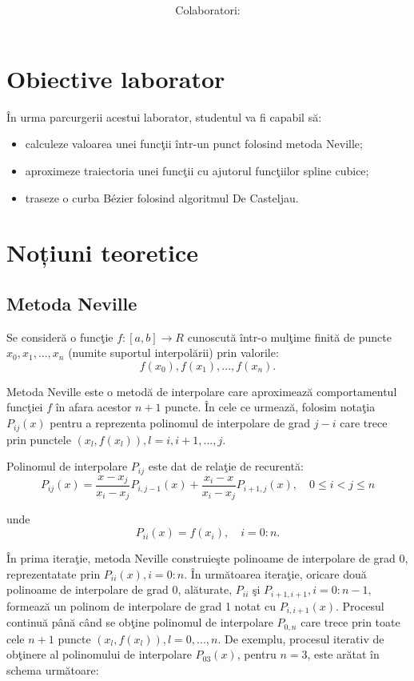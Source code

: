 \documentclass{exam}
\title{
	\textmd{\textbf{\MNLabTitle}}
	\author{Colaboratori: \MNAuthor}
}
\begin{document}
\begin{coverpages}

	\maketitle
	\tableofcontents

\end{coverpages}

\section{Obiective laborator}

În urma parcurgerii acestui laborator, studentul va fi capabil să:
\begin{itemize}
	\item calculeze valoarea unei funcţii într-un punct folosind metoda Neville;
	\item aproximeze traiectoria unei funcţii cu ajutorul funcţiilor spline cubice;
	\item traseze o curba B\'{e}zier folosind algoritmul De Casteljau.
\end{itemize}

\section{Noțiuni teoretice}

\subsection{Metoda Neville}

Se consideră o funcţie $f:[a, b] \rightarrow R$ cunoscută într-o mulţime finită de puncte $x_0,x_1, ...,x_n$ (numite suportul interpolării) prin valorile: $$f(x_0), f(x_1), ...,f(x_n).$$

Metoda Neville este o metodă de interpolare care aproximează comportamentul funcţiei $f$ în afara acestor $n+1$ puncte. În cele ce urmează, folosim notaţia $P_{ij}(x)$ pentru a reprezenta polinomul de interpolare de grad $j-i$ care trece prin punctele $(x_l, f(x_{l})), l=i, i+1,...,j$.

Polinomul de interpolare $P_{ij}$ este dat de relaţie de recurentă:
$$P_{ij}(x) = \frac{x-x_j}{x_i-x_j}P_{i,j-1}(x) + \frac{x_i-x}{x_i-x_j}P_{i+1,j}(x), \quad 0 \leq i < j \leq n $$

\noindent unde
$$P_{ii}(x)=f(x_{i}), \quad i = 0:n.$$

În prima iteraţie, metoda Neville construieşte polinoame de interpolare de grad 0, reprezentatate prin $P_{ii}(x), i = 0:n$. În următoarea iteraţie, oricare două polinoame de interpolare de grad 0, alăturate, $P_{ii}$ şi $P_{i+1, i+1}, i=0:n-1$, formează un polinom de interpolare de grad 1 notat cu $P_{i, i+1}(x)$. Procesul continuă până când se obţine polinomul de interpolare $P_{0, n}$ care trece prin toate cele $n+1$ puncte $(x_l, f(x_{l})), l=0,...,n$. De exemplu, procesul iterativ de obţinere al polinomului de interpolare $P_{03}(x)$, pentru $n=3$, este arătat în schema următoare:
\end{document}

